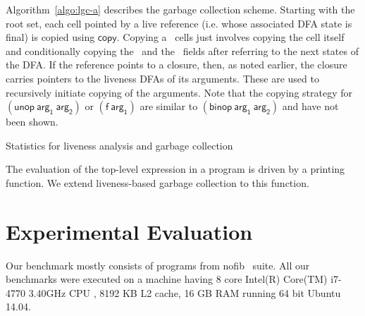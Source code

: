 \documentclass[preprint,9pt]{sigplanconf}
\begin{document}
Algorithm~\ref{algo:lgc-a}   describes   the   garbage
collection scheme.  Starting with the root set, each cell pointed by a
live reference  (i.e. whose associated  DFA state is final)  is copied
using $\mathsf{copy}$.   Copying a \CONS\ cells  just involves copying
the  cell  itself   and  conditionally  copying  the   \CAR\  and  the
\CDR\ fields after referring to the  next states of the DFA.  If
the reference points to a closure, then, as noted earlier, the closure
carries pointers  to the liveness  DFAs of its  arguments.  These
are  used to recursively  initiate copying of  the arguments.
Note that  the copying  strategy for  $\mathsf{(unop~arg_1~arg_2)}$ or
$\mathsf{(f~arg_1)}$ are similar to $\mathsf{(binop~arg_1~arg_2)}$ and
have not been shown.



\begin{table*}[t!]
\caption{Statistics for liveness analysis and garbage collection}
\label{tab:exp-results}
\centering


\vskip -5mm
\end{table*} 





The evaluation of  the top-level expression in a program  is driven by
a printing function.  
We extend liveness-based  garbage  collection  to
this function.

\section{Experimental Evaluation}
\label{sec:experiments}
  Our benchmark mostly consists  of programs from nofib~\cite{nofib}
suite.  All our
benchmarks were executed on a  machine having 8 core Intel(R) Core(TM)
i7-4770 3.40GHz  CPU ,  8192 KB  L2 cache,  16 GB  RAM running  64 bit
Ubuntu 14.04.
\end{document}
